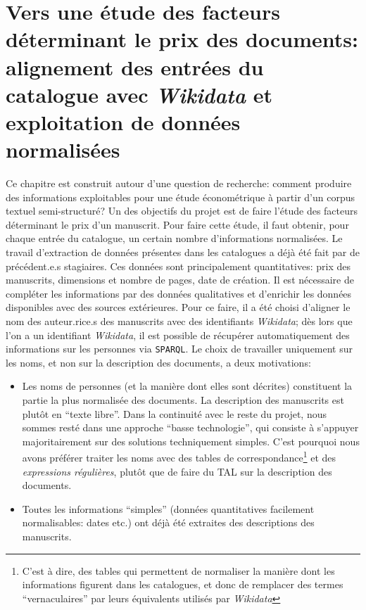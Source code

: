 \documentclass[a4paper, 12pt, twoside]{book}
\newcommand{\rgx}{\textit{expressions régulières}}
\newcommand{\sparql}{\texttt{SPARQL}}
\newcommand{\wkd}{\textit{Wikidata}}
\begin{document}
\chapter{Vers une étude des facteurs déterminant le prix des documents: alignement des entrées du catalogue avec \wkd{} et exploitation de données normalisées}
Ce chapitre est construit autour d'une question de recherche: comment produire des informations exploitables pour une étude économétrique à partir d'un corpus textuel semi-structuré? Un des objectifs du projet est de faire l'étude des facteurs déterminant le prix d'un manuscrit. Pour faire cette étude, il faut obtenir, pour chaque entrée du catalogue, un certain nombre d'informations normalisées. Le travail d'extraction de données présentes dans les catalogues a déjà été fait par de précédent.e.s stagiaires. Ces données sont principalement quantitatives: prix des manuscrits, dimensions et nombre de pages, date de création. Il est nécessaire de compléter les informations par des données qualitatives et d'enrichir les données disponibles avec des sources extérieures. Pour ce faire, il a été choisi d'aligner le nom des auteur.rice.s des manuscrits avec des identifiants \wkd{}; dès lors que l'on a un identifiant \wkd{}, il est possible de récupérer automatiquement des informations sur les personnes via \sparql. Le choix de travailler uniquement sur les noms, et non sur la description des documents, a deux motivations:
\begin{itemize}
	\item Les noms de personnes (et la manière dont elles sont décrites) constituent la partie la plus normalisée des documents. La description des manuscrits est plutôt en \enquote{texte libre}. Dans la continuité avec le reste du projet, nous sommes resté dans une approche \enquote{basse technologie}, qui consiste à s'appuyer majoritairement sur des solutions techniquement simples. C'est pourquoi nous avons préférer traiter les noms avec des tables de correspondance\footnote{C'est à dire, des tables qui permettent de normaliser la manière dont les informations figurent dans les catalogues, et donc de remplacer des termes \enquote{vernaculaires} par leurs équivalents utilisés par \wkd{}} et des \rgx{}, plutôt que de faire du TAL sur la description des documents.
	\item Toutes les informations \enquote{simples} (données quantitatives facilement normalisables: dates etc.) ont déjà été extraites des descriptions des manuscrits.
\end{itemize}
\end{document}
